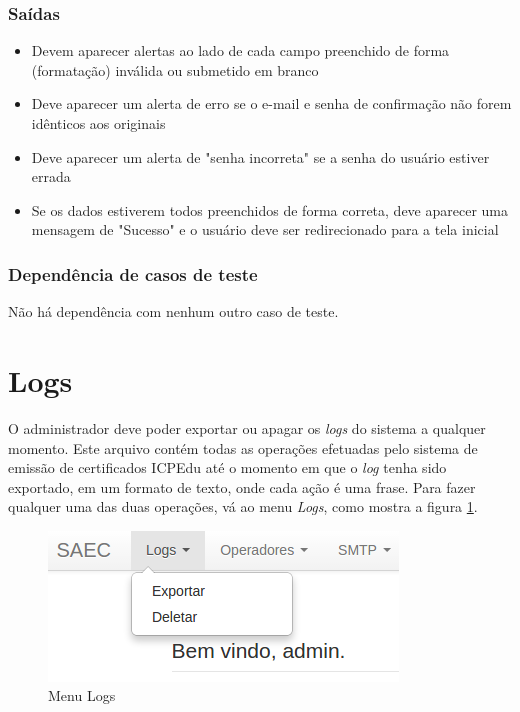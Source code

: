 \subsubsection{Saídas}

\begin{itemize}

	\item Devem aparecer alertas ao lado de cada campo preenchido de forma (formatação) inválida ou submetido em branco
	\item Deve aparecer um alerta de erro se o e-mail e senha de confirmação não forem idênticos aos originais
	\item Deve aparecer um alerta de "senha incorreta" se a senha do usuário estiver errada
	\item Se os dados estiverem todos preenchidos de forma correta, deve aparecer uma mensagem de "Sucesso" e o usuário deve ser redirecionado para a tela inicial
	
\end{itemize}

\subsubsection{Dependência de casos de teste}
Não há dependência com nenhum outro caso de teste.

\section{Logs}\label{sec:logs}

O administrador deve poder exportar ou apagar os \textit{logs} do sistema a qualquer momento. Este arquivo contém todas as operações efetuadas pelo sistema de emissão de certificados ICPEdu até o momento em que o \textit{log} tenha sido exportado, em um formato de texto, onde cada ação é uma frase. Para fazer qualquer uma das duas operações, vá ao menu \textit{Logs}, como mostra a figura \ref{fig:logs}.

\begin{figure}[ht]
    \centering
     \includegraphics[scale=0.5]{images/logs.png}
     \caption{Menu Logs}
     \label{fig:logs}
\end{figure}

